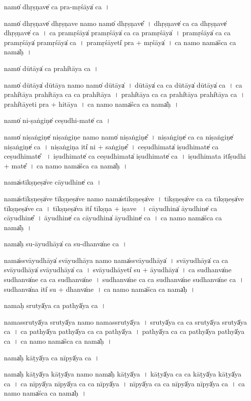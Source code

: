 \documentclass[parskip, DIV=14]{scrartcl}
\begin{document}
{namo̍ dhṛ॒ṣṇave̍ ca pra-mṛ॒śāya̍ ca॒~।

namo̍ dhṛ॒ṣṇave̍ dhṛ॒ṣṇave॒ namo॒ namo̍ dhṛ॒ṣṇave̎~।
dhṛ॒ṣṇave̍ ca ca dhṛ॒ṣṇave̍ dhṛ॒ṣṇave̍ ca~।
ca॒ pra॒mṛ॒śāya̍ pramṛ॒śāya̍ ca ca pramṛ॒śāya̍~।
pra॒mṛ॒śāya̍ ca ca pramṛ॒śāya̍ pramṛ॒śāya̍ ca~।
pra॒mṛ॒śāyeti̍ pra + mṛ॒śāya̍~।
ca॒ namo॒ nama̍śca ca॒ nama̍ḥ~।

namo̍ dū॒tāya̍ ca॒ prahi̍tāya ca॒~।

namo̍ dū॒tāya̍ dū॒tāya॒ namo॒ namo̍ dū॒tāya̍~।
dū॒tāya̍ ca ca dū॒tāya̍ dū॒tāya̍ ca~।
ca॒ prahi̍tāya॒ prahi̍tāya ca ca॒ prahi̍tāya~।
prahi̍tāya ca ca॒ prahi̍tāya॒ prahi̍tāya ca~।
prahi̍tā॒yeti॒ pra + hi॒tā॒ya॒~।
ca॒ namo॒ nama̍śca ca॒ nama̍ḥ~।

namo̍ ni-ṣa॒ṅgiṇe̍ ceṣudhi॒-mate̍ ca॒~।

namo̍ niṣa॒ṅgiṇe̍ niṣa॒ṅgiṇe॒ namo॒ namo̍ niṣa॒ṅgiṇe̎~।
 ni॒ṣa॒ṅgiṇe̍ ca ca niṣa॒ṅgiṇe̍ niṣa॒ṅgiṇe̍ ca~।
 ni॒ṣa॒ṅgiṇa॒ iti̍ ni +  sa॒ṅgiṇe̎~।
 ce॒ṣu॒dhi॒mata̍ iṣudhi॒mate̍ ca ceṣudhi॒mate̎ ~।
 i॒ṣu॒dhi॒mate̍ ca ceṣudhi॒mata̍ iṣudhi॒mate̍ ca~।
 i॒ṣu॒dhi॒mata॒ itī̍ṣudhi + mate̎~।
ca॒ namo॒ nama̍śca ca॒ nama̍ḥ~।

nama̍stī॒kṣṇeṣa̍ve cāyu॒dhine̍ ca॒~।

nama̍stī॒kṣṇeṣa̍ve tī॒kṣṇeṣa̍ve॒ namo॒ nama̍stī॒kṣṇeṣa̍ve~।
tī॒kṣṇeṣa̍ve ca ca tī॒kṣṇeṣa̍ve tī॒kṣṇeṣa̍ve ca~।
tī॒kṣṇeṣa̍va॒ iti̍ tī॒kṣṇa + i॒ṣa॒ve॒ ~।
cā॒yu॒dhina̍ āyu॒dhine̍ ca cāyu॒dhine̎~।
ā॒yu॒dhine̍ ca cāyu॒dhina̍ āyu॒dhine̍ ca~।
ca॒ namo॒ nama̍śca ca॒ nama̍ḥ~।

nama̍ḥ su-āyu॒dhāya̍ ca su॒-dhanva̍ne ca॒~।

nama̍ssvāyu॒dhāya̍ svāyu॒dhāya॒ namo॒ nama̍ssvāyu॒dhāya̍~।
svā॒yu॒dhāya̍ ca ca svāyu॒dhāya̍ svāyu॒dhāya̍ ca~।
svā॒yu॒dhāyeti̍ su + ā॒yu॒dhāya̍~।
ca॒ su॒dhanva̍ne su॒dhanva̍ne ca ca su॒dhanva̍ne~।
su॒dhanva̍ne ca ca su॒dhanva̍ne su॒dhanva̍ne ca~।
su॒dhanva̍na॒ iti̍  su + dhanva̍ne~।
ca॒ namo॒ nama̍śca ca॒ nama̍ḥ~।

nama॒ḥ srutyā̍ya ca॒ pathyā̍ya ca॒~।

nama॒ssrutyā̍ya॒ srutyā̍ya॒ namo॒ nama॒ssrutyā̍ya~।
srutyā̍ya ca ca॒ srutyā̍ya॒ srutyā̍ya ca~।
ca॒ pathyā̍ya॒ pathyā̍ya ca ca॒ pathyā̍ya~।
pathyā̍ya ca ca॒ pathyā̍ya॒ pathyā̍ya ca~।
ca॒ namo॒ nama̍śca ca॒ nama̍ḥ~।

nama̍ḥ kā॒ṭyā̍ya ca nī॒pyā̍ya ca॒~।

nama̍ḥ kā॒ṭyā̍ya kā॒ṭyā̍ya॒ namo॒ nama̍ḥ kā॒ṭyā̍ya~।
kā॒ṭyā̍ya ca ca kā॒ṭyā̍ya kā॒ṭyā̍ya ca~।
ca॒ nī॒pyā̍ya nī॒pyā̍ya ca ca nī॒pyā̍ya~।
nī॒pyā̍ya ca ca nī॒pyā̍ya nī॒pyā̍ya ca~।
ca॒ namo॒ nama̍śca ca॒ nama̍ḥ~।

}
\end{document}
